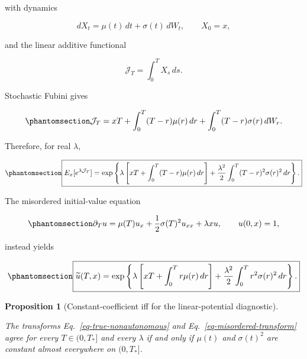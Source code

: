 \documentclass[
  english,
  11pt,
  letterpaper,
  DIV=11,
  numbers=noendperiod]{scrartcl}
\theoremstyle{plain}
\theoremstyle{plain}
\theoremstyle{plain}
\theoremstyle{plain}
\newtheorem{proposition}{Proposition}[section]
\theoremstyle{remark}
\begin{document}
with dynamics

\[
dX_t=\mu(t)\,dt+\sigma(t)\,dW_t,
\qquad X_0=x,
\]

and the linear additive functional

\[
\mathcal J_T=\int_0^TX_s\,ds.
\]

Stochastic Fubini gives

\begin{equation}\protect\phantomsection\label{eq-integrated-gaussian}{
\mathcal J_T
=xT
+\int_0^T(T-r)\mu(r)\,dr
+\int_0^T(T-r)\sigma(r)\,dW_r.
}\end{equation}

Therefore, for real \(\lambda\),

\begin{equation}\protect\phantomsection\label{eq-true-nonautonomous}{
\boxed{
E_x[e^{\lambda\mathcal J_T}]
=
\exp\left\{
\lambda\left[
xT+\int_0^T(T-r)\mu(r)\,dr
\right]
+\frac{\lambda^2}{2}
\int_0^T(T-r)^2\sigma(r)^2\,dr
\right\}.
}
}\end{equation}

The misordered initial-value equation

\begin{equation}\protect\phantomsection\label{eq-misordered-pde}{
\partial_Tu
=\mu(T)u_x+\frac12\sigma(T)^2u_{xx}
+\lambda xu,
\qquad
u(0,x)=1,
}\end{equation}

instead yields

\begin{equation}\protect\phantomsection\label{eq-misordered-transform}{
\boxed{
\widetilde u(T,x)
=
\exp\left\{
\lambda\left[
xT+\int_0^Tr\mu(r)\,dr
\right]
+\frac{\lambda^2}{2}
\int_0^Tr^2\sigma(r)^2\,dr
\right\}.
}
}\end{equation}

\begin{proposition}[Constant-coefficient iff for the linear-potential
diagnostic]\protect\hypertarget{prp-linear-classification}{}\label{prp-linear-classification}

The transforms Eq.~\ref{eq-true-nonautonomous} and
Eq.~\ref{eq-misordered-transform} agree for every \(T\in(0,T_*]\) and
every \(\lambda\) if and only if \(\mu(t)\) and \(\sigma(t)^2\) are
constant almost everywhere on \((0,T_*]\).

\end{proposition}
\end{document}
